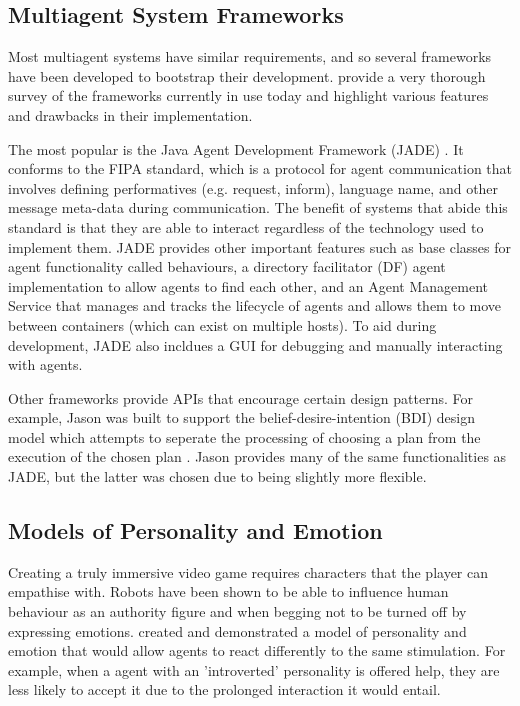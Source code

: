 \documentclass[conference]{IEEEtran}
\begin{document}
\subsection{Multiagent System Frameworks}

Most multiagent systems have similar requirements, and so several frameworks have been developed to bootstrap their development. \cite{massurvey} provide a very thorough survey of the frameworks currently in use today and highlight various features and drawbacks in their implementation. 

The most popular is the Java Agent Development Framework (JADE) \cite{jade}. It conforms to the FIPA standard, which is a protocol for agent communication that involves defining performatives (e.g. request, inform), language name, and other message meta-data during communication. The benefit of systems that abide this standard is that they are able to interact regardless of the technology used to implement them. JADE provides other important features such as base classes for agent functionality called behaviours, a directory facilitator (DF) agent implementation to allow agents to find each other, and an Agent Management Service that manages and tracks the lifecycle of agents and allows them to move between containers (which can exist on multiple hosts). To aid during development, JADE also incldues a GUI for debugging and manually interacting with agents.

Other frameworks provide APIs that encourage certain design patterns. For example, Jason was built to support the belief-desire-intention (BDI) design model which attempts to seperate the processing of choosing a plan from the execution of the chosen plan \cite{jason}. Jason provides many of the same functionalities as JADE, but the latter was chosen due to being slightly more flexible.

\subsection{Models of Personality and Emotion}

Creating a truly immersive video game requires characters that the player can empathise with. Robots have been shown to be able to influence human behaviour as an authority figure \cite{bossrobot} and when begging not to be turned off \cite{turnoffrobot} by expressing emotions. \cite{personalitymodel} created and demonstrated a model of personality and emotion that would allow agents to react differently to the same stimulation. For example, when a agent with an 'introverted' personality is offered help, they are less likely to accept it due to the prolonged interaction it would entail. 
\end{document}
